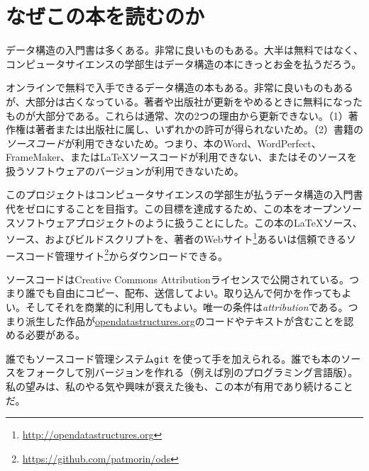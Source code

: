 \chapter*{なぜこの本を読むのか}

データ構造の入門書は多くある。非常に良いものもある。大半は無料ではなく、コンピュータサイエンスの学部生はデータ構造の本にきっとお金を払うだろう。

オンラインで無料で入手できるデータ構造の本もある。非常に良いものもあるが、大部分は古くなっている。著者や出版社が更新をやめるときに無料になったものが大部分である。これらは通常、次の2つの理由から更新できない。（1）著作権は著者または出版社に属し、いずれかの許可が得られないため。（2）書籍の\emph{ソースコード}が利用できないため。つまり、本のWord、WordPerfect、FrameMaker、または\LaTeX{}ソースコードが利用できない、またはそのソースを扱うソフトウェアのバージョンが利用できないため。

このプロジェクトはコンピュータサイエンスの学部生が払うデータ構造の入門書代をゼロにすることを目指す。この目標を達成するため、この本をオープンソースソフトウェアプロジェクトのように扱うことにした。この本の\LaTeX{}ソース、\lang{}ソース、およびビルドスクリプトを、著者のWebサイト\footnote {\url{http://opendatastructures.org}}あるいは信頼できるソースコード管理サイト\footnote {\url{https://github.com/patmorin/ods}}からダウンロードできる。

ソースコードはCreative Commons Attributionライセンスで公開されている。つまり誰でも自由にコピー、配布、送信してよい。取り込んで何かを作ってもよい。そしてそれを商業的に利用してもよい。唯一の条件は\emph{attribution}である。つまり派生した作品が\url{opendatastructures.org}のコードやテキストが含むことを認める必要がある。

誰でもソースコード管理システム\texttt{git} を使って手を加えられる。誰でも本のソースをフォークして別バージョンを作れる（例えば別のプログラミング言語版）。私の望みは、私のやる気や興味が衰えた後も、この本が有用であり続けることだ。
